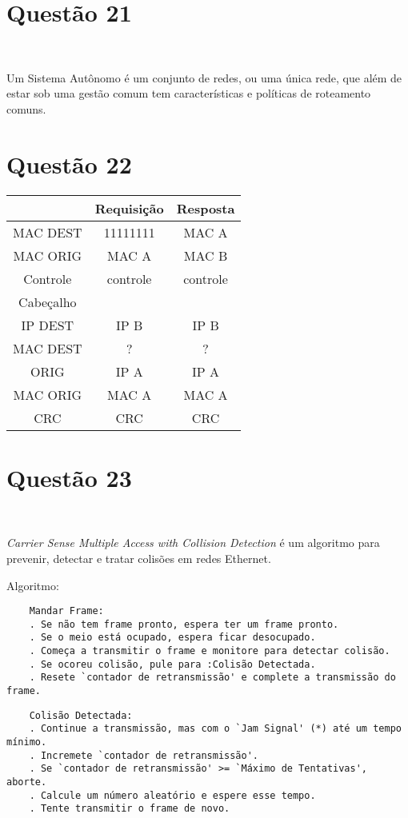 \documentclass{article}
\begin{document}
\section*{Questão 21}\

Um Sistema Autônomo é um conjunto de redes, ou uma única rede, que além de
estar sob uma gestão comum tem características e políticas de roteamento
comuns.

\newpage
\section*{Questão 22}

\begin{table}[h]
    \centering
\begin{tabular}{|c|c|c|}
    \hline
    & Requisição & Resposta \\ \hline
    MAC DEST & 11111111 & MAC A \\ \hline
    MAC ORIG & MAC A & MAC B \\ \hline
    Controle & controle & controle \\ \hline
    Cabeçalho & & \\ \hline
    IP DEST & IP B & IP B \\ \hline
    MAC DEST & ? & ? \\ \hline
    ORIG & IP A & IP A \\ \hline
    MAC ORIG & MAC A & MAC A \\ \hline
    CRC & CRC & CRC \\ \hline
\end{tabular}
\end{table}

\section*{Questão 23}\

\textit{Carrier Sense Multiple Access with Collision Detection}
é um algoritmo para prevenir,
detectar e tratar colisões em redes Ethernet.

Algoritmo:
\begin{verbatim}
    Mandar Frame:
    . Se não tem frame pronto, espera ter um frame pronto.
    . Se o meio está ocupado, espera ficar desocupado.
    . Começa a transmitir o frame e monitore para detectar colisão.
    . Se ocoreu colisão, pule para :Colisão Detectada.
    . Resete `contador de retransmissão' e complete a transmissão do frame.
\end{verbatim}
\begin{verbatim}
    Colisão Detectada:
    . Continue a transmissão, mas com o `Jam Signal' (*) até um tempo mínimo.
    . Incremete `contador de retransmissão'.
    . Se `contador de retransmissão' >= `Máximo de Tentativas', aborte.
    . Calcule um número aleatório e espere esse tempo.
    . Tente transmitir o frame de novo.
\end{verbatim}
\end{document}
